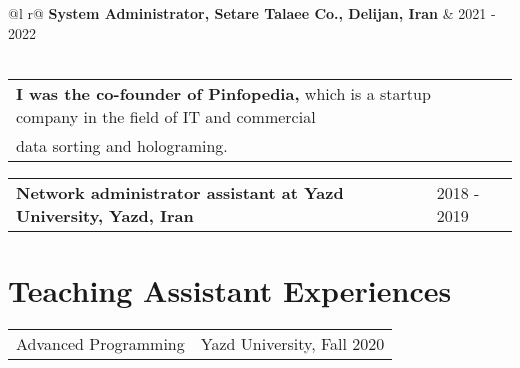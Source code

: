 \documentclass[letter,12pt]{article}
\begin{document}
\begin{tabularx}{\linewidth}{ @{}l r@{} }
\textbf{System Administrator, Setare Talaee Co., Delijan, Iran} & \hfill 2021 - 2022 \\[1pt]
 \\
\end{tabularx}
\vspace{-0.1cm}

\begin{tabularx}{\linewidth}{ @{}l r@{} }
\textbf{I was the co-founder of Pinfopedia,} which is a startup company in the field of IT and commercial \\
data sorting and holograming. \\
\end{tabularx}
\vspace{-0.3cm}

\begin{tabularx}{\linewidth}{ @{}l X@{} }
\textbf{Network administrator assistant at Yazd University, Yazd, Iran} & \hfill 2018 - 2019 \\
\end{tabularx}



\vspace{-0.2cm}

\section{Teaching Assistant Experiences}

\begin{tabularx}{\linewidth}{ @{}l X@{} }
Advanced Programming & \hfill Yazd University, Fall 2020 \\[0pt]
\end{tabularx}
\vspace{-0.7cm}
\end{document}
